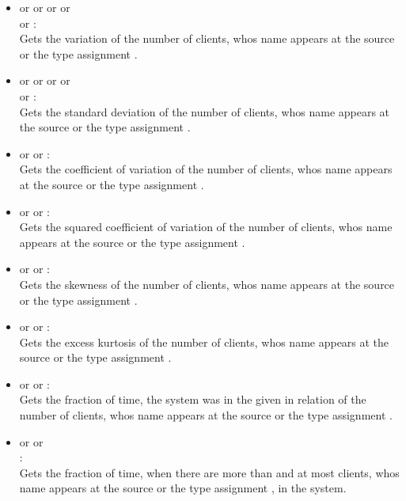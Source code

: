 \begin{itemize}
\item
{} or  or  or  or\\
 or :\\
Gets the variation of the number of clients, whos name appears at the source or the type assignment .

\item
{} or  or  or  or\\
 or :\\
Gets the standard deviation of the number of clients, whos name appears at the source or the type assignment .

\item
{} or  or :\\
Gets the coefficient of variation of the number of clients, whos name appears at the source or the type assignment .

\item
{} or  or :\\
Gets the squared coefficient of variation of the number of clients, whos name appears at the source or the type assignment .

\item
{} or  or :\\
Gets the skewness of the number of clients, whos name appears at the source or the type assignment .

\item
{} or  or :\\
Gets the excess kurtosis of the number of clients, whos name appears at the source or the type assignment .

\item
{} or  or :\\
Gets the fraction of time, the system was in the given  in relation of the number of clients, whos name appears at the source or the type assignment .

\item
{} or  or\\
:\\
Gets the fraction of time, when there are more than  and at most  clients, whos name appears at the source or the type assignment , in the system.

\end{itemize}



